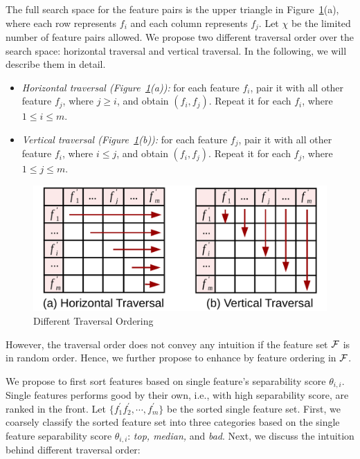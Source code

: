 The full search space for the feature pairs is the upper triangle in Figure~\ref{fig:traversal}(a), where each row represents $f_i$ and each column represents $f_j$. Let $\chi$ be the limited number of feature pairs allowed. We propose two different traversal order over the search space: horizontal traversal and vertical traversal. In the following, we will describe them in detail.
\begin{itemize}
\item \emph{Horizontal traversal (Figure~\ref{fig:traversal}(a)):} for each feature $f_i$, pair it with all other feature $f_j$, where $j\geq i$, and obtain $(f_i,f_j)$. Repeat it for each $f_i$, where $1 \leq i\leq m$.
\item \emph{Vertical traversal (Figure~\ref{fig:traversal}(b)):} for each feature $f_j$, pair it with all other feature $f_i$, where $i\leq j$, and obtain $(f_i,f_j)$. Repeat it for each $f_j$, where $1 \leq j\leq m$.
\end{itemize}

\begin{figure}[h]
  \centering
  \includegraphics[width=0.85\linewidth]{fig/traversal.pdf}
  \vspace{-3mm}
\caption{Different Traversal Ordering}
\label{fig:traversal}
\end{figure} 

However, the traversal order does not convey any intuition if the feature set $\ff$ is in random order. Hence, we further propose to enhance \traversal by feature ordering in $\ff$.

 We propose to first sort features based on single feature's separability score $\theta_{i,i}$. Single features performs good by their own, i.e., with high separability score, are ranked in the front. Let $\{f_1^{'} f_2^{'},\cdots,f_m^{'}\}$ be the sorted single feature set. First, we coarsely classify the sorted feature set into three categories based on the single feature separability score $\theta_{i,i}$: {\em top, median,} and {\em bad}. Next, we discuss the intuition behind different traversal order:

